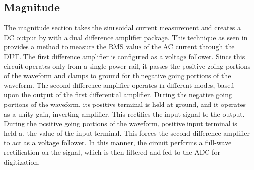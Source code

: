 \subsection{Magnitude}

The magnitude section takes the sinusoidal current measurement and creates a DC output by with a dual difference amplifier package. This technique as seen in \cite{absCircuit} provides a method to measure the RMS value of the AC current through the DUT. The first difference amplifier is configured as a voltage follower. Since this circuit operates only from a single power rail, it passes the positive going portions of the waveform and clamps to ground for th negative going portions of the waveform. The second difference amplifier operates in different modes, based upon the output of the first differential amplifier. During the negative going portions of the waveform, its positive terminal is held at ground, and it operates as a unity gain, inverting amplifier. This rectifies the input signal to the output. During the positive going portions of the waveform, positive input terminal is held at the value of the input terminal. This forces the second difference amplifier to act as a voltage follower. In this manner, the circuit performs a full-wave rectification on the signal, which is then filtered and fed to the ADC for digitization.
